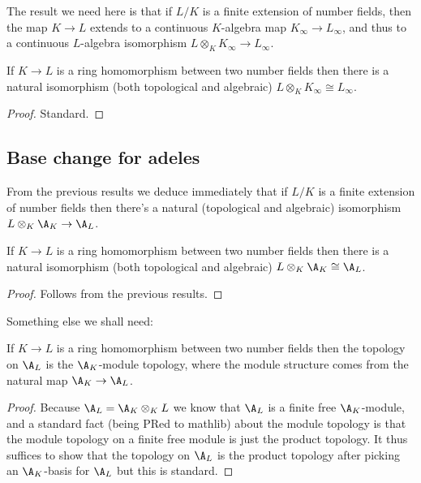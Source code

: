 The result we need here is that if $L/K$ is a finite extension of number fields,
then the map $K\to L$ extends to a continuous $K$-algebra map $K_\infty\to L_\infty$,
and thus to a continuous $L$-algebra isomorphism $L\otimes_KK_\infty\to L_\infty$.

\begin{theorem}
  \label{NumberField.InfiniteAdeleRing.baseChangeEquiv}
  If $K\to L$ is a ring homomorphism between two number fields then there is a natural isomorphism
  (both topological and algebraic) $L\otimes_KK_\infty\cong L_\infty$.
\end{theorem}
\begin{proof}
  Standard.
\end{proof}

\subsection{Base change for adeles}

From the previous results we deduce immediately that if $L/K$ is a finite extension
of number fields then there's a natural (topological and algebraic) isomorphism
$L\otimes_K\A_K\to \A_L$.

\begin{theorem}
  \label{NumberField.AdeleRing.baseChangeEquiv}
  If $K\to L$ is a ring homomorphism between two number fields then there is a natural isomorphism
  (both topological and algebraic) $L\otimes_K\A_K\cong\A_L$.
\end{theorem}
\begin{proof}
  Follows from the previous results.
\end{proof}

Something else we shall need:

\begin{theorem}
  \label{NumberField.AdeleRing.baseChange_moduleTopology}
  If $K\to L$ is a ring homomorphism between two number fields then the topology on $\A_L$
  is the $\A_K$-module topology, where the module structure comes from the
  natural map $\A_K\to\A_L$.
\end{theorem}
\begin{proof}
  Because $\A_L=\A_K\otimes_{K}L$ we know that $\A_L$ is a finite free $\A_K$-module,
  and a standard fact (being PRed to mathlib) about the module topology is that the module topology
  on a finite free module is just the product topology. It thus suffices to show that
  the topology on $\A_L$ is the product topology after picking an $\A_K$-basis for $\A_L$
  but this is standard.
\end{proof}

